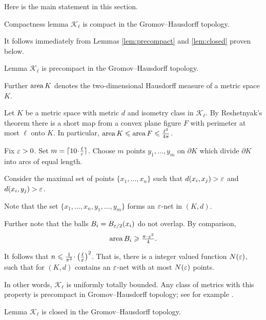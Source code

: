 \documentclass{article}
\begin{document}
Here is the main statement in this section.

\begin{thm}{Compactness lemma}\label{lem:compact}
$\mathcal{K}_\ell$ is compact in the Gromov--Hausdorff topology.
\end{thm}

It follows immediately from Lemmas \ref{lem:precompact} and \ref{lem:closed} proven below.

\begin{thm}{Lemma}\label{lem:precompact}
$\mathcal{K}_\ell$ is precompact in the Gromov--Hausdorff topology.
\end{thm}

Further $\mathop{\rm area}\nolimits K$ denotes the two-dimensional Hausdorff measure of a metric space $K$. 

Let $K$ be a metric space with metric $d$ and isometry class in $\mathcal {K}_\ell$.
By Reshetnyak's theorem there is a short map from a convex plane figure $F$ with perimeter at most $\ell$ onto $K$.
In particular, $\mathop{\rm area}\nolimits K \leqslant \mathop{\rm area}\nolimits F \leqslant \tfrac{\ell^2}{4\pi}$.

Fix $\varepsilon>0$. 
Set $m=\lceil 10\cdot\tfrac\ell\eps\rceil$.
Choose $m$ points $y_1,\dots,y_m$ on $\partial K$
which divide $\partial K$ into arcs of equal length.

Consider the maximal set of points $\{x_1,\dots,x_n\}$ such that $d(x_i,x_j)>\varepsilon$ and $d(x_i,y_j)>\varepsilon$.

Note that the set $\{x_1,\dots,x_n,y_1,\dots,y_m\}$
forms an $\varepsilon$-net in $(K,d)$.

Further note that the balls $B_i=B_{\varepsilon/2}(x_i)$
do not overlap.
By comparison,
\[\area B_i\ge \tfrac{\pi\cdot\eps^2}{4}.\]

It follows that $n\le \tfrac{1}{\pi^2}\cdot\left(\tfrac\ell\eps\right)^2$.
That is, there is a integer valued function $N(\varepsilon)$,
such that for  
$(K,d)$ contains an $\varepsilon$-net
with at most $N(\varepsilon)$ points.

In other words, $\mathcal{K}_\ell$ is uniformly totally bounded.
Any class of metrics with this property is precompact in Gromov--Hausdorff topology; 
see for example \cite[7.4.15]{BBI}.
\qeds





\begin{thm}{Lemma}\label{lem:closed}
$\mathcal{K}_\ell$ is closed in the Gromov--Hausdorff topology.
\end{thm}
\end{document}
